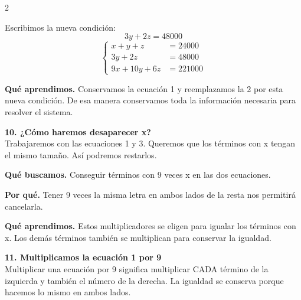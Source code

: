 \documentclass[11pt,a4paper,landscape]{article}
\begin{document}
\begin{multicols*}{2}
\begin{minipage}{\linewidth}
\par\smallskip Escribimos la nueva condición:
\[3y + 2z = 48000\]
\[\left\{\begin{aligned}x + y + z &= 24000\\3y + 2z &= 48000\\9x + 10y + 6z &= 221000\end{aligned}\right.\]
\par\smallskip\textbf{Qué aprendimos.} Conservamos la ecuación 1 y reemplazamos la 2 por esta nueva condición. De esa manera conservamos toda la información necesaria para resolver el sistema.
\end{minipage}\par\medskip
\noindent\begin{minipage}{\linewidth}\textbf{10. ¿Cómo haremos desaparecer x?}\\[2pt]Trabajaremos con las ecuaciones 1 y 3. Queremos que los términos con x tengan el mismo tamaño. Así podremos restarlos.
\par\smallskip\textbf{Qué buscamos.} Conseguir términos con 9 veces x en las dos ecuaciones.
\par\smallskip\textbf{Por qué.} Tener 9 veces la misma letra en ambos lados de la resta nos permitirá cancelarla.
\par{}\par\smallskip
\par\smallskip\textbf{Qué aprendimos.} Estos multiplicadores se eligen para igualar los términos con x. Los demás términos también se multiplican para conservar la igualdad.
\end{minipage}\par\medskip
\noindent\begin{minipage}{\linewidth}\textbf{11. Multiplicamos la ecuación 1 por 9}\\[2pt]Multiplicar una ecuación por 9 significa multiplicar CADA término de la izquierda y también el número de la derecha. La igualdad se conserva porque hacemos lo mismo en ambos lados.

\end{minipage}
\end{multicols*}
\end{document}
